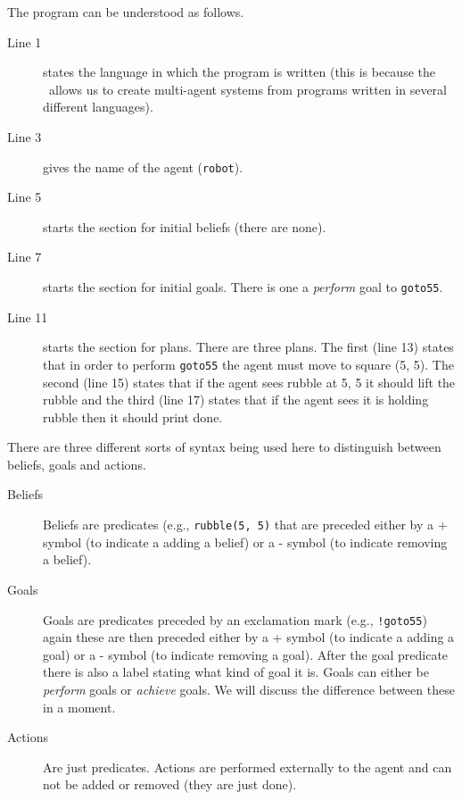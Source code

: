 The program can be understood as follows.  
\begin{description}
\item[Line 1] states the language in which the program is written (this is because the \ail\ allows us to create multi-agent systems from programs written in several different languages).  
\item[Line 3] gives the name of the agent (\lstinline{robot}).  
\item[Line 5] starts the section for initial beliefs (there are none).  
\item[Line 7] starts the section for initial goals.  There is one a \emph{perform} goal to \lstinline{goto55}.
\item[Line 11] starts the section for plans.  There are three plans.  The first (line 13) states that in order to perform \lstinline{goto55} the agent must move to square (5, 5).  The second (line 15) states that if the agent sees rubble at 5, 5 it should lift the rubble and the third  (line 17) states that if the agent sees it is holding rubble then it should print done.
\end{description}

There are three different sorts of syntax being used here to distinguish between beliefs, goals and actions.

\begin{description}
\item[Beliefs] Beliefs are predicates (e.g., \lstinline{rubble(5, 5)} that are preceded either by a + symbol (to indicate a adding a belief) or a - symbol (to indicate removing a belief).
\item[Goals] Goals are predicates preceded by an exclamation mark (e.g., \lstinline{!goto55}) again these are then preceded  either by a + symbol (to indicate a adding a goal) or a - symbol (to indicate removing a goal).  After the goal predicate there is also a label stating what kind of goal it is.  Goals can either be \emph{perform} goals or \emph{achieve} goals.  We will discuss the difference between these in a moment.
\item[Actions] Are just predicates.  Actions are performed externally to the agent and can not be added or removed (they are just done).
\end{description}

